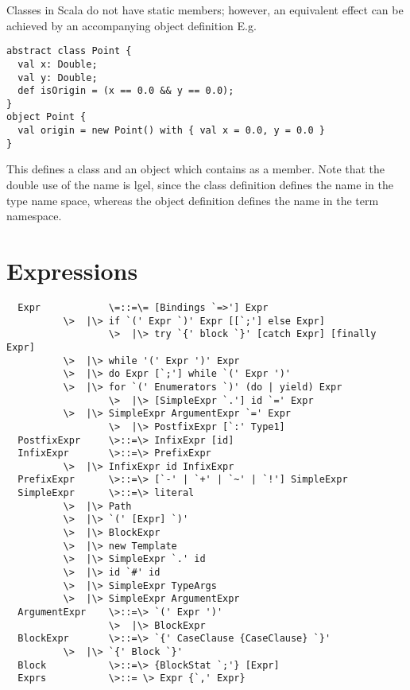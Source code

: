 \documentclass[11pt]{report}
\begin{document}
\example
Classes in Scala do not have static members; however, an equivalent
effect can be achieved by an accompanying object definition
E.g.
\begin{verbatim}
abstract class Point {
  val x: Double;
  val y: Double;
  def isOrigin = (x == 0.0 && y == 0.0);
}
object Point {
  val origin = new Point() with { val x = 0.0, y = 0.0 }
}
\end{verbatim}
This defines a class \verb@Point@ and an object \verb@Point@ which
contains \verb@origin@ as a member.  Note that the double use of the
name \verb@Point@ is lgel, since the class definition defines the name
\verb@Point@ in the type name space, whereas the object definition
defines the name in the term namespace.


\chapter{Expressions}
\label{sec:exprs}

\syntax\begin{verbatim}
  Expr            \=::=\= [Bindings `=>'] Expr
		  \>  |\> if `(' Expr `)' Expr [[`;'] else Expr]
                  \>  |\> try `{' block `}' [catch Expr] [finally Expr]
		  \>  |\> while '(' Expr ')' Expr
		  \>  |\> do Expr [`;'] while `(' Expr ')'
		  \>  |\> for `(' Enumerators `)' (do | yield) Expr
                  \>  |\> [SimpleExpr `.'] id `=' Expr
		  \>  |\> SimpleExpr ArgumentExpr `=' Expr
                  \>  |\> PostfixExpr [`:' Type1]
  PostfixExpr     \>::=\> InfixExpr [id]
  InfixExpr       \>::=\> PrefixExpr
		  \>  |\> InfixExpr id InfixExpr
  PrefixExpr      \>::=\> [`-' | `+' | `~' | `!'] SimpleExpr 
  SimpleExpr      \>::=\> literal
		  \>  |\> Path
		  \>  |\> `(' [Expr] `)'
		  \>  |\> BlockExpr
		  \>  |\> new Template 
		  \>  |\> SimpleExpr `.' id 
		  \>  |\> id `#' id 
		  \>  |\> SimpleExpr TypeArgs
		  \>  |\> SimpleExpr ArgumentExpr
  ArgumentExpr    \>::=\> `(' Expr ')'
                  \>  |\> BlockExpr
  BlockExpr       \>::=\> `{' CaseClause {CaseClause} `}'
		  \>  |\> `{' Block `}'
  Block           \>::=\> {BlockStat `;'} [Expr]
  Exprs           \>::= \> Expr {`,' Expr}
\end{verbatim}
\end{document}
